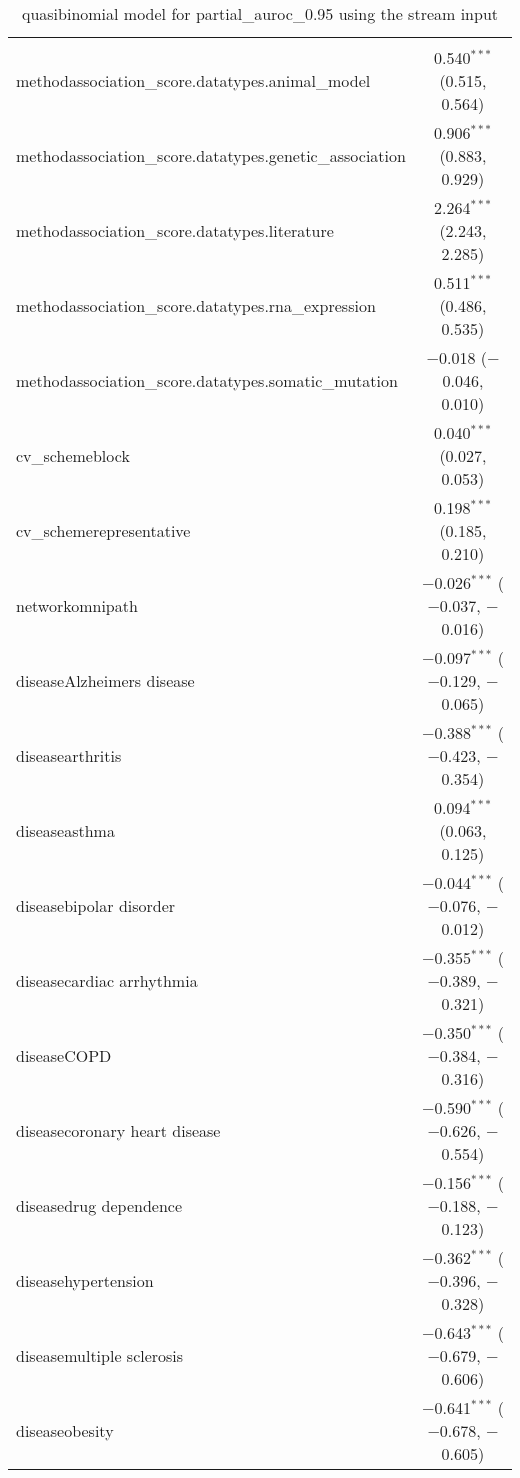 
\begin{table}[!htbp] \centering 
  \caption{quasibinomial model for partial_auroc_0.95 using the stream input} 
  \label{} 
\begin{tabular}{@{\extracolsep{5pt}}lc} 
\\[-1.8ex]\hline 
\hline \\[-1.8ex] 
 methodassociation\_score.datatypes.animal\_model & 0.540$^{***}$ (0.515, 0.564) \\ 
  methodassociation\_score.datatypes.genetic\_association & 0.906$^{***}$ (0.883, 0.929) \\ 
  methodassociation\_score.datatypes.literature & 2.264$^{***}$ (2.243, 2.285) \\ 
  methodassociation\_score.datatypes.rna\_expression & 0.511$^{***}$ (0.486, 0.535) \\ 
  methodassociation\_score.datatypes.somatic\_mutation & $-$0.018 ($-$0.046, 0.010) \\ 
  cv\_schemeblock & 0.040$^{***}$ (0.027, 0.053) \\ 
  cv\_schemerepresentative & 0.198$^{***}$ (0.185, 0.210) \\ 
  networkomnipath & $-$0.026$^{***}$ ($-$0.037, $-$0.016) \\ 
  diseaseAlzheimers disease & $-$0.097$^{***}$ ($-$0.129, $-$0.065) \\ 
  diseasearthritis & $-$0.388$^{***}$ ($-$0.423, $-$0.354) \\ 
  diseaseasthma & 0.094$^{***}$ (0.063, 0.125) \\ 
  diseasebipolar disorder & $-$0.044$^{***}$ ($-$0.076, $-$0.012) \\ 
  diseasecardiac arrhythmia & $-$0.355$^{***}$ ($-$0.389, $-$0.321) \\ 
  diseaseCOPD & $-$0.350$^{***}$ ($-$0.384, $-$0.316) \\ 
  diseasecoronary heart disease & $-$0.590$^{***}$ ($-$0.626, $-$0.554) \\ 
  diseasedrug dependence & $-$0.156$^{***}$ ($-$0.188, $-$0.123) \\ 
  diseasehypertension & $-$0.362$^{***}$ ($-$0.396, $-$0.328) \\ 
  diseasemultiple sclerosis & $-$0.643$^{***}$ ($-$0.679, $-$0.606) \\ 
  diseaseobesity & $-$0.641$^{***}$ ($-$0.678, $-$0.605) \\ 

\end{tabular}
\end{table}
